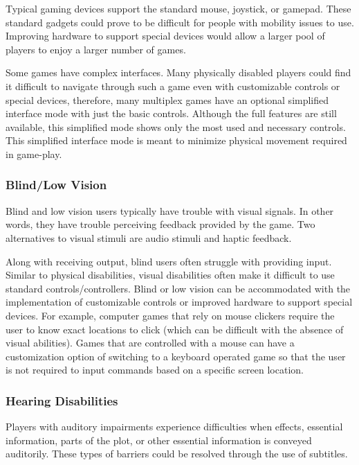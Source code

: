 \documentclass[10pt,twocolumn]{article}
\begin{document}
Typical gaming devices support the standard mouse, joystick, or gamepad. These standard gadgets could prove to be difficult for people with mobility issues to use. Improving hardware to support special devices would allow a larger pool of players to enjoy a larger number of games. 

Some games have complex interfaces. Many physically disabled players could find it difficult to navigate through such a game even with customizable controls or special devices, therefore, many multiplex games have an optional simplified interface mode with just the basic controls. Although the full features are still available, this simplified mode shows only the most used and necessary controls. This simplified interface mode is meant to minimize physical movement required in game-play.

\subsubsection{Blind/Low Vision}

Blind and low vision users typically have trouble with visual signals. In other words, they have trouble perceiving feedback provided by the game. \cite{eskelinen2001gaming} Two alternatives to visual stimuli are audio stimuli and haptic feedback. 

Along with receiving output, blind users often struggle with providing input. Similar to physical disabilities, visual disabilities often make it difficult to use standard controls/controllers. Blind or low vision can be accommodated with the implementation of customizable controls or improved hardware to support special devices. For example, computer games that rely on mouse clickers require the user to know exact locations to click (which can be difficult with the absence of visual abilities). Games that are controlled with a mouse can have a customization option of switching to a keyboard operated game so that the user is not required to input commands based on a specific screen location.

\subsubsection{Hearing Disabilities}
Players with auditory impairments experience difficulties when effects, essential information, parts of the plot, or other essential information is conveyed auditorily. \cite{eskelinen2001gaming} These types of barriers could be resolved through the use of subtitles.
    
\end{document}
